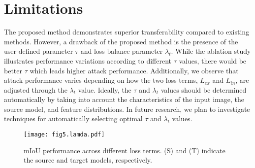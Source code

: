 \section{Limitations}
\label{sec5:limitation}

The proposed method demonstrates superior transferability compared to existing methods. However, a drawback of the proposed method is the presence of the user-defined parameter $\tau$ and loss balance parameter $\lambda_{t}$. While the ablation study illustrates performance variations according to different $\tau$ values, there would be better $\tau$ which leads higher attack performance. Additionally, we observe that attack performance varies depending on how the two loss terms, $L_{ex}$ and $L_{in}$, are adjusted through the $\lambda_{t}$ value. Ideally, the $\tau$ and $\lambda_{t}$ values should be determined automatically by taking into account the characteristics of the input image, the source model, and feature distributions. In future research, we plan to investigate techniques for automatically selecting optimal $\tau$ and $\lambda_{t}$ values.

\begin{figure}
\centering
\texttt{[image: fig5.lamda.pdf]}
\caption{mIoU performance across different loss terms. (S) and (T) indicate the source and target models, respectively.}
\label{fig:fig5}
\end{figure}